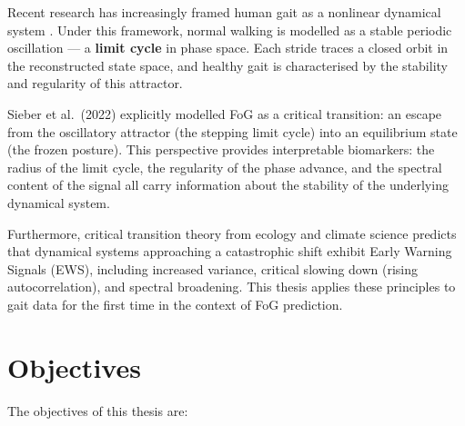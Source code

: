 \documentclass[12pt,a4paper,oneside]{report}
\numberwithin{equation}{chapter}
\numberwithin{figure}{chapter}
\numberwithin{table}{chapter}
\begin{document}
Recent research has increasingly framed human gait as a nonlinear dynamical system \cite{stergiou2004, dingwell2001, hausdorff1995}. Under this framework, normal walking is modelled as a stable periodic oscillation --- a \textbf{limit cycle} in phase space. Each stride traces a closed orbit in the reconstructed state space, and healthy gait is characterised by the stability and regularity of this attractor.

Sieber et al.\ (2022) \cite{sieber2022} explicitly modelled FoG as a critical transition: an escape from the oscillatory attractor (the stepping limit cycle) into an equilibrium state (the frozen posture). This perspective provides interpretable biomarkers: the radius of the limit cycle, the regularity of the phase advance, and the spectral content of the signal all carry information about the stability of the underlying dynamical system.

Furthermore, critical transition theory from ecology and climate science \cite{scheffer2009, dakos2012} predicts that dynamical systems approaching a catastrophic shift exhibit Early Warning Signals (EWS), including increased variance, critical slowing down (rising autocorrelation), and spectral broadening. This thesis applies these principles to gait data for the first time in the context of FoG prediction.

\section{Objectives}

The objectives of this thesis are:
\end{document}
